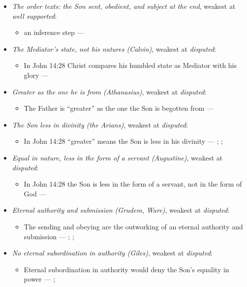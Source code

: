 \documentclass[11pt,paper=\testimonypaper,DIV=13,parskip=false]{scrartcl}
\begin{document}
\begin{itemize}
\item \emph{The order texts: the Son sent, obedient, and subject at the end}, weakest at \emph{well supported}:
\begin{itemize}
\item an inference step --- \cite[3, The Triune God]{kibbey-living-systematic-theology-2026}
\end{itemize}
\item \emph{The Mediator’s state, not his natures (Calvin)}, weakest at \emph{disputed}:
\begin{itemize}
\item In John 14:28 Christ compares his humbled state as Mediator with his glory --- \cite[102--103]{calvin-commentary-john-2-1847}
\end{itemize}
\item \emph{Greater as the one he is from (Athanasius)}, weakest at \emph{disputed}:
\begin{itemize}
\item The Father is “greater” as the one the Son is begotten from --- \cite[Against the Arians I.13.58]{schaff-nicene-post-nicene-fathers-2-4-1892}
\end{itemize}
\item \emph{The Son less in divinity (the Arians)}, weakest at \emph{disputed}:
\begin{itemize}
\item In John 14:28 “greater” means the Son is less in his divinity --- \cite[De Synodis 28]{schaff-nicene-post-nicene-fathers-2-4-1892}; \cite[On the Trinity I.7.14]{schaff-nicene-post-nicene-fathers-1-3-1887}; \cite[102]{calvin-commentary-john-2-1847}
\end{itemize}
\item \emph{Equal in nature, less in the form of a servant (Augustine)}, weakest at \emph{disputed}:
\begin{itemize}
\item In John 14:28 the Son is less in the form of a servant, not in the form of God --- \cite[On the Trinity I.7.14]{schaff-nicene-post-nicene-fathers-1-3-1887}
\end{itemize}
\item \emph{Eternal authority and submission (Grudem, Ware)}, weakest at \emph{disputed}:
\begin{itemize}
\item The sending and obeying are the outworking of an eternal authority and submission --- \cite[40]{grudem-doctrinal-deviations-2015}; \cite{grudem-ets-trinity-2016}; \cite{ware-father-son-holy-spirit-2005}
\end{itemize}
\item \emph{No eternal subordination in authority (Giles)}, weakest at \emph{disputed}:
\begin{itemize}
\item Eternal subordination in authority would deny the Son’s equality in power --- \cite[323]{giles-ets-trinity-2008}; \cite{giles-jesus-and-the-father-2006}
\end{itemize}
\end{itemize}
\end{document}
